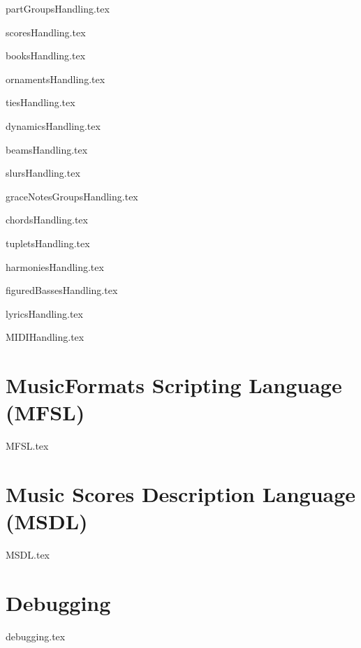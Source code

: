 \documentclass[11pt,a4paper]{report}
\begin{document}
{partGroupsHandling.tex}

{scoresHandling.tex}

{booksHandling.tex}

{ornamentsHandling.tex}

{tiesHandling.tex}

{dynamicsHandling.tex}

{beamsHandling.tex}

{slursHandling.tex}

{graceNotesGroupsHandling.tex}

{chordsHandling.tex}

{tupletsHandling.tex}

{harmoniesHandling.tex}

{figuredBassesHandling.tex}

{lyricsHandling.tex}

{MIDIHandling.tex}


\part{MusicFormats Scripting Language (MFSL)}

{MFSL.tex}


\part{Music Scores Description Language (MSDL)}

{MSDL.tex}


\part{Debugging}

{debugging.tex}


\end{document}
